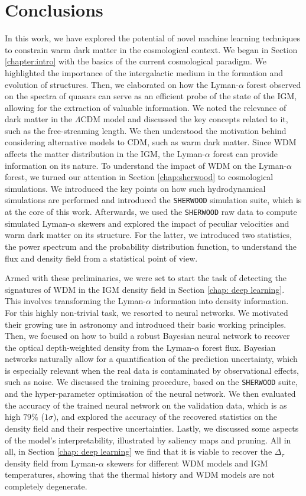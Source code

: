 \chapter{Conclusions}
In this work, we have explored the potential of novel machine learning techniques to constrain warm dark matter in the cosmological context. We began in Section \ref{chapter:intro} with the basics of the current cosmological paradigm. We highlighted the importance of the intergalactic medium in the formation and evolution of structures. Then, we elaborated on how the Lyman-$\alpha$ forest observed on the spectra of quasars can serve as an efficient probe of the state of the IGM, allowing for the extraction of valuable information. We noted the relevance of dark matter in the $\Lambda$CDM model and discussed the key concepts related to it, such as the free-streaming length. We then understood the motivation behind considering alternative models to CDM, such as warm dark matter. Since WDM affects the matter distribution in the IGM, the Lyman-$\alpha$ forest can provide information on its nature. To understand the impact of WDM on the Lyman-$\alpha$ forest, we turned our attention in Section \ref{chap:sherwood} to cosmological simulations. We introduced the key points on how such hydrodynamical simulations are performed and introduced the \texttt{SHERWOOD} simulation suite, which is at the core of this work. Afterwards, we used the \texttt{SHERWOOD} raw data to compute simulated Lyman-$\alpha$ skewers and explored the impact of peculiar velocities and warm dark matter on its structure. For the latter, we introduced two statistics, the power spectrum and the probability distribution function, to understand the flux and density field from a statistical point of view.

Armed with these preliminaries, we were set to start the task of detecting the signatures of WDM in the IGM density field in Section \ref{chap: deep learning}. This involves transforming the Lyman-$\alpha$ information into density information. For this highly non-trivial task, we resorted to neural networks. We motivated their growing use in astronomy and introduced their basic working principles. Then, we focused on how to build a robust Bayesian neural network to recover the optical depth-weighted density from the Lyman-$\alpha$ forest flux. Bayesian networks naturally allow for a quantification of the prediction uncertainty, which is especially relevant when the real data is contaminated by observational effects, such as noise. We discussed the training procedure, based on the \texttt{SHERWOOD} suite, and the hyper-parameter optimisation of the neural network. We then evaluated the accuracy of the trained neural network on the validation data, which is as high $79 \%$ ($1\sigma$), and explored the accuracy of the recovered statistics on the density field and their respective uncertainties. Lastly, we discussed some aspects of the model's interpretability, illustrated by saliency maps and pruning. All in all, in Section \ref{chap: deep learning} we find that it is viable to recover the $\Delta_\tau$ density field from Lyman-$\alpha$ skewers for different WDM models and IGM temperatures, showing that the thermal history and WDM models are not completely degenerate.


